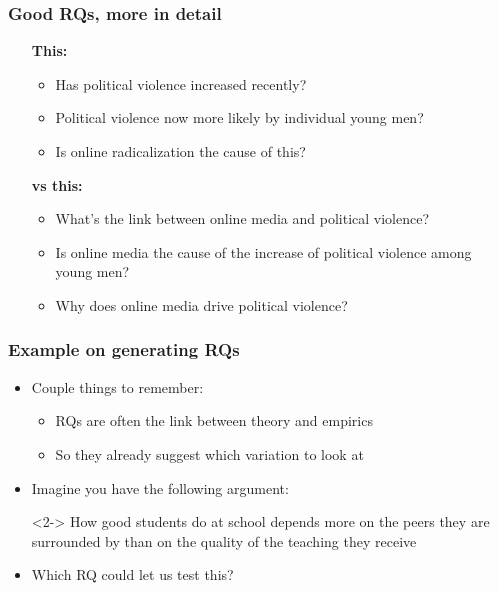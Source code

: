 \documentclass[aspectratio=43]{beamer}
\begin{document}
\begin{frame}
\frametitle{Good RQs, more in detail}
\centering

\begin{itemize}
  \item[] \textbf{This:}
  \begin{itemize}
    \item Has political violence increased recently?
    \item Political violence now more likely by individual young men?
    \item Is online radicalization the cause of this?
  \end{itemize}
  \item[] \textbf{vs this:}
  \begin{itemize}
    \item What's the link between online media and political violence?
    \item[] {\color{asher}{\small (too broad)}}
    \item Is online media the cause of the increase of political violence among young men? {\color{asher}{\small (many questions in one)}}
    \item Why does online media drive political violence? {\color{asher}{\small (??)}}
  \end{itemize}
\end{itemize}

\end{frame}

\begin{frame}
\frametitle{Example on generating RQs}
\centering

\begin{itemize}
  \item<1-> Couple things to remember:
  \begin{itemize}
    \item RQs are often the link between theory and empirics
    \item So they already suggest which variation to look at
  \end{itemize}
  \item[]
  \item<2-> Imagine you have the following argument:
  \item[]<2-> How good students do at school depends more on the peers they are surrounded by than on the quality of the teaching they receive
  \item[]
  \item<2-> Which RQ could let us test this?
\end{itemize}

\end{frame}
\end{document}
